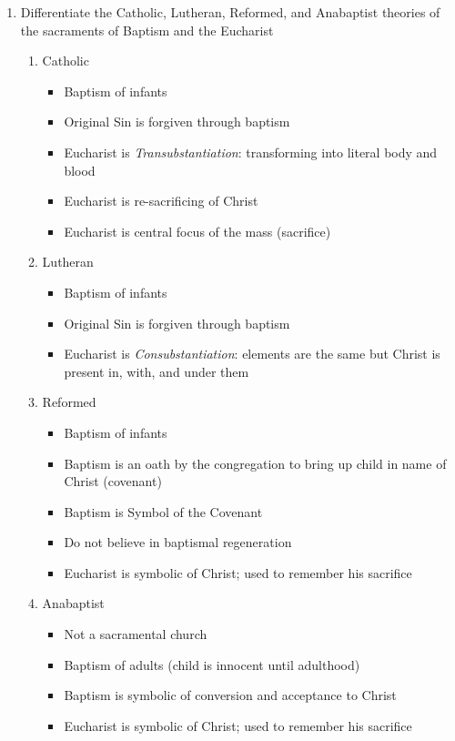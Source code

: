 \documentclass[8pt]{article}
\begin{document}
\begin{enumerate}
    \item Differentiate the Catholic, Lutheran, Reformed, and Anabaptist theories of the sacraments of Baptism and the Eucharist
    \begin{enumerate}
        \item Catholic
        \begin{itemize}
            \item Baptism of infants
            \item Original Sin is forgiven through baptism
            \item Eucharist is \textit{Transubstantiation}: transforming into literal body and blood
            \item Eucharist is re-sacrificing of Christ
            \item Eucharist is central focus of the mass (sacrifice)
        \end{itemize}
        \item Lutheran
        \begin{itemize}
            \item Baptism of infants
            \item Original Sin is forgiven through baptism
            \item Eucharist is \textit{Consubstantiation}: elements are the same but Christ is present in, with, and under them
        \end{itemize}
        \item Reformed
        \begin{itemize}
            \item Baptism of infants
            \item Baptism is an oath by the congregation to bring up child in name of Christ (covenant)
            \item Baptism is Symbol of the Covenant
            \item Do not believe in baptismal regeneration
            \item Eucharist is symbolic of Christ; used to remember his sacrifice
        \end{itemize}
        \item Anabaptist
        \begin{itemize}
            \item Not a sacramental church
            \item Baptism of adults (child is innocent until adulthood)
            \item Baptism is symbolic of conversion and acceptance to Christ
            \item Eucharist is symbolic of Christ; used to remember his sacrifice
        \end{itemize}
    \end{enumerate}


\end{enumerate}
\end{document}
